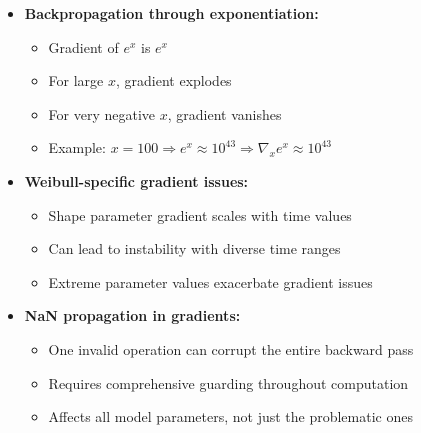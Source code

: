 \begin{itemize}
    \item \textbf{Backpropagation through exponentiation:}
    \begin{itemize}
        \item Gradient of $e^x$ is $e^x$
        \item For large $x$, gradient explodes
        \item For very negative $x$, gradient vanishes
        \item Example: $x = 100 \Rightarrow e^x \approx 10^{43} \Rightarrow \nabla_x e^x \approx 10^{43}$
    \end{itemize}
    
    \item \textbf{Weibull-specific gradient issues:}
    \begin{itemize}
        \item Shape parameter gradient scales with time values
        \item Can lead to instability with diverse time ranges
        \item Extreme parameter values exacerbate gradient issues
    \end{itemize}
    
    \item \textbf{NaN propagation in gradients:}
    \begin{itemize}
        \item One invalid operation can corrupt the entire backward pass
        \item Requires comprehensive guarding throughout computation
        \item Affects all model parameters, not just the problematic ones
    \end{itemize}
\end{itemize}

